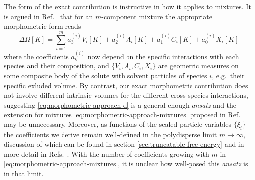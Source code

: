 \documentclass[11pt,twoside]{report}
\def\includebibliography{}
\begin{document}
The form of the exact contribution is instructive in how it applies to mixtures.
It is argued in Ref.\ \cite{KodamaJCP2011} that for an $m$-component mixture the appropriate morphometric form reads
\begin{equation}\label{eq:morphometric-approach-mixtures}
  \Delta \Omega[K]
  =
  \sum_{i=1}^m
  a_3^{(i)} V_i[K]
  + a_2^{(i)} A_i[K]
  + a_1^{(i)} C_i[K]
  + a_0^{(i)} X_i[K]
\end{equation}
where the coefficients $a_k^{(i)}$ now depend on the specific interactions with each species and their composition, and $\{V_i, A_i, C_i, X_i\}$ are geometric measures on some composite body of the solute with solvent particles of species $i$, e.g.\ their specific exluded volume.
By contrast, our exact morphometric contribution does not involve different intrinsic volumes for the different cross-species interactions, suggesting \eqref{eq:morphometric-approach-d} is a general enough \emph{ansatz} and the extension for mixtures \eqref{eq:morphometric-approach-mixtures} proposed in Ref.\ \cite{KodamaJCP2011} may be unnecessary.
Moreover, as functions of the scaled particle variables $\{\xi_i\}$ the coefficients we derive remain well-defined in the polydisperse limit $m \to \infty$, discussion of which can be found in section \ref{sec:truncatable-free-energy} and in more detail in Refs.\ \cite{GualtieriJCP1982,WarrenPRL1998,SollichPRL1998,SollichAiCP2001}.
With the number of coefficients growing with $m$ in \eqref{eq:morphometric-approach-mixtures}, it is unclear how well-posed this \emph{ansatz} is in that limit.

\ifdefined\includebibliography
  \printbibliography
\fi
\end{document}
